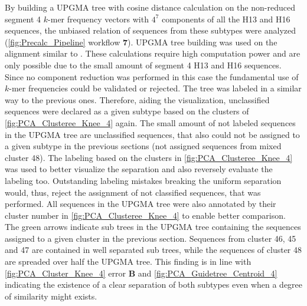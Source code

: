 \vspace{1em}

By building a \gls{UPGMA} tree with cosine distance calculation on the non-reduced segment 4 $k$-mer frequency vectors with $4^7$ components of all the H13 and H16 sequences, the unbiased relation of sequences from these subtypes were analyzed (\autoref{fig:Precalc_Pipeline} workflow \textsf{\textbf{7}}). \gls{UPGMA} tree building was used on the alignment similar to \textcite{moss_identification_2011}. These calculations require high computation power and are only possible due to the small amount of segment 4 H13 and H16 sequences. Since no component reduction was performed in this case the fundamental use of $k$-mer frequencies could be validated or rejected. The tree was labeled in a similar way to the previous ones. Therefore, aiding the visualization, unclassified sequences were declared as a given subtype based on the clusters of \autoref{fig:PCA_Clusteree_Knee_4} again. The small amount of not labeled sequences in the \gls{UPGMA} tree are unclassified sequences, that also could not be assigned to a given subtype in the previous sections (not assigned sequences from mixed cluster 48). The labeling based on the clusters in \autoref{fig:PCA_Clusteree_Knee_4} was used to better visualize the separation and also reversely evaluate the labeling too. Outstanding labeling mistakes breaking the uniform separation would, thus, reject the assignment of not classified sequences, that was performed. All sequences in the \gls{UPGMA} tree were also annotated by their cluster number in \autoref{fig:PCA_Clusteree_Knee_4} to enable better comparison. The green arrows indicate sub trees in the \gls{UPGMA} tree containing the sequences assigned to a given cluster in the previous section. Sequences from cluster 46, 45 and 47 are contained in well separated sub trees, while the sequences of cluster 48 are spreaded over half the \gls{UPGMA} tree. This finding is in line with \autoref{fig:PCA_Cluster_Knee_4} error \textbf{\textsf{B}} and \autoref{fig:PCA_Guidetree_Centroid_4} indicating the existence of a clear separation of both subtypes even when a degree of similarity might exists.

